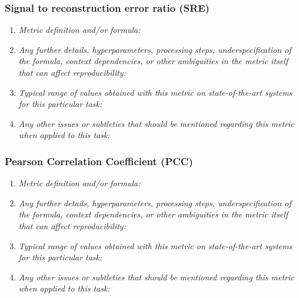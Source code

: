 \documentclass[a4paper,11pt]{article}
\begin{document}
        \subsubsection{Signal to reconstruction error ratio (SRE)}
            \begin{enumerate}[label=\alph*.]
                \item \textit{Metric definition and/or formula:}
                \bigskip
                \item \textit{Any further details, hyperparameters, processing steps, underspecification of the formula, context dependencies, or other ambiguities in the metric itself that can affect reproducibility:}
                \bigskip
                \item \textit{Typical range of values obtained with this metric on state-of-the-art systems for this particular task:}
                \bigskip
                \item \textit{Any other issues or subtleties that should be mentioned regarding this metric when applied to this task:}
                \bigskip
            \end{enumerate}
        \subsubsection{Pearson Correlation Coefficient (PCC)}
            \begin{enumerate}[label=\alph*.]
                \item \textit{Metric definition and/or formula:}
                \bigskip
                \item \textit{Any further details, hyperparameters, processing steps, underspecification of the formula, context dependencies, or other ambiguities in the metric itself that can affect reproducibility:}
                \bigskip
                \item \textit{Typical range of values obtained with this metric on state-of-the-art systems for this particular task:}
                \bigskip
                \item \textit{Any other issues or subtleties that should be mentioned regarding this metric when applied to this task:}
                \bigskip
            \end{enumerate}
\end{document}
